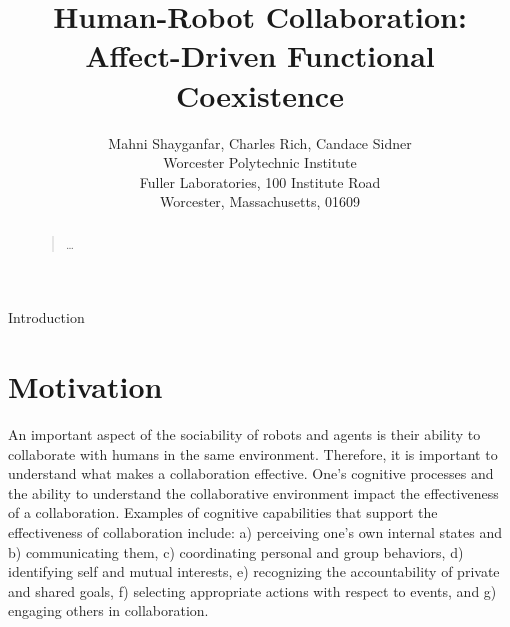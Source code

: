 \documentclass[letterpaper]{article}
\begin{document}
%
\title{Human-Robot Collaboration: Affect-Driven Functional Coexistence}
\author{Mahni Shayganfar, Charles Rich, Candace Sidner\\
Worcester Polytechnic Institute\\
Fuller Laboratories, 100 Institute Road\\
Worcester, Massachusetts, 01609\\
}
\maketitle
\begin{abstract}
\begin{quote}
\ldots 
\end{quote}
\end{abstract}

\noindent Introduction

\section{Motivation}

An important aspect of the sociability of robots and agents is their ability to
collaborate with humans in the same environment. Therefore, it is important to
understand what makes a collaboration effective. One's cognitive processes and
the ability to understand the collaborative environment impact the effectiveness
of a collaboration. Examples of cognitive capabilities that support the
effectiveness of collaboration include: a) perceiving one's own internal states
and b) communicating them, c) coordinating personal and group behaviors, d)
identifying self and mutual interests, e) recognizing the accountability of
private and shared goals, f) selecting appropriate actions with respect to
events, and g) engaging others in collaboration.
\end{document}

